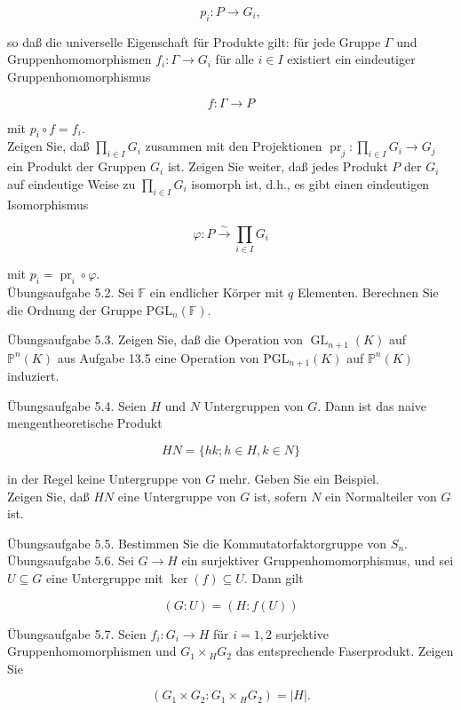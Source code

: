 \documentclass[10pt, letterpaper]{article}
\begin{document}
$$
p_{i}: P \rightarrow G_{i},
$$

so daß die universelle Eigenschaft für Produkte gilt: für jede Gruppe $\Gamma$ und Gruppenhomomorphismen $f_{i}: \Gamma \rightarrow G_{i}$ für alle $i \in I$ existiert ein eindeutiger Gruppenhomomorphismus

$$
f: \Gamma \rightarrow P
$$

mit $p_{i} \circ f=f_{i}$.\\
Zeigen Sie, daß $\prod_{i \in I} G_{i}$ zusammen mit den Projektionen $\operatorname{pr}_{j}: \prod_{i \in I} G_{i} \rightarrow G_{j}$ ein Produkt der Gruppen $G_{i}$ ist. Zeigen Sie weiter, daß jedes Produkt $P$ der $G_{i}$ auf eindeutige Weise zu $\prod_{i \in I} G_{i}$ isomorph ist, d.h., es gibt einen eindeutigen Isomorphismus

$$
\varphi: P \xrightarrow{\sim} \prod_{i \in I} G_{i}
$$

mit $p_{i}=\operatorname{pr}_{i} \circ \varphi$.\\
Übungsaufgabe 5.2. Sei $\mathbb{F}$ ein endlicher Körper mit $q$ Elementen. Berechnen Sie die Ordnung der Gruppe $\mathrm{PGL}_{n}(\mathbb{F})$.

Übungsaufgabe 5.3. Zeigen Sie, daß die Operation von $\operatorname{GL}_{n+1}(K)$ auf $\mathbb{P}^{n}(K)$ aus Aufgabe 13.5 eine Operation von $\mathrm{PGL}_{n+1}(K)$ auf $\mathbb{P}^{n}(K)$ induziert.

Übungsaufgabe 5.4. Seien $H$ und $N$ Untergruppen von $G$. Dann ist das naive mengentheoretische Produkt

$$
H N=\{h k ; h \in H, k \in N\}
$$

in der Regel keine Untergruppe von $G$ mehr. Geben Sie ein Beispiel.\\
Zeigen Sie, daß $H N$ eine Untergruppe von $G$ ist, sofern $N$ ein Normalteiler von $G$ ist.

Übungsaufgabe 5.5. Bestimmen Sie die Kommutatorfaktorgruppe von $S_{n}$.\\
Übungsaufgabe 5.6. Sei $G \rightarrow H$ ein surjektiver Gruppenhomomorphismus, und sei $U \subseteq G$ eine Untergruppe mit $\operatorname{ker}(f) \subseteq U$. Dann gilt

$$
(G: U)=(H: f(U))
$$

Übungsaufgabe 5.7. Seien $f_{i}: G_{i} \rightarrow H$ für $i=1,2$ surjektive Gruppenhomomorphismen und $G_{1} \times{ }_{H} G_{2}$ das entsprechende Faserprodukt. Zeigen Sie

$$
\left(G_{1} \times G_{2}: G_{1} \times{ }_{H} G_{2}\right)=|H| .
$$
\end{document}
